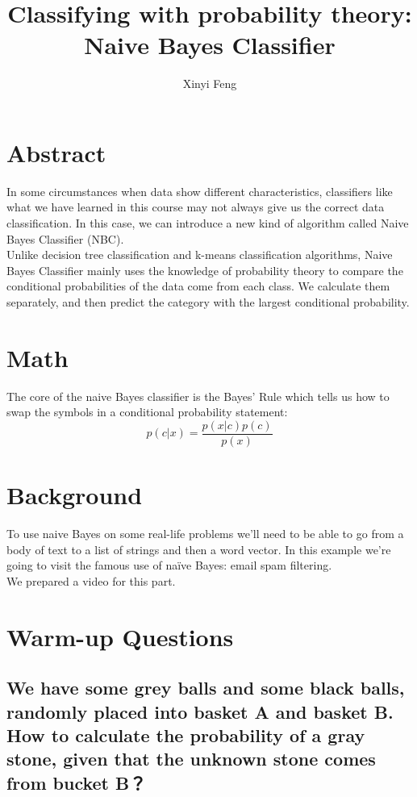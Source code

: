 \documentclass[11pt,a4paper]{article}
\title{Classifying with probability theory: Naive Bayes Classifier}
\author[a]{Xinyi Feng}
\affil[a]{xfeng82@wisc.edu}
\date{}
\begin{document}
  \maketitle
  
\section{Abstract}
In some circumstances when data show different characteristics, classifiers
like what we have learned in this course may not always give us the correct
data classification. In this case, we can introduce a new kind of algorithm
called Naive Bayes Classifier (NBC).\\
Unlike decision tree classification and k-means classification algorithms, Naive Bayes Classifier mainly uses the knowledge of probability theory to compare the conditional probabilities of the data come from each class. We calculate them separately, and then predict the category with the largest conditional probability. 

\section{Math}
The core of the naive Bayes classifier is the Bayes' Rule which tells us how to swap the symbols in a conditional probability statement:
\begin{equation}
p(c|x)=\frac{p(x|c)p(c)}{p(x)}
\end{equation}
\section{Background}

To use naive Bayes on some real-life problems we’ll need to be able to go from a body of text to a list of strings and then a word vector. In this example we’re going to visit the famous use of naïve Bayes: email spam filtering.\\
We prepared a video for this part.

\section{Warm-up Questions}
\subsection{We have some grey balls and some black balls, randomly placed into basket A and basket B. How to calculate the probability of a gray stone, given that the unknown stone comes from bucket B？}
~\\~\\~\\~\\
\end{document}
